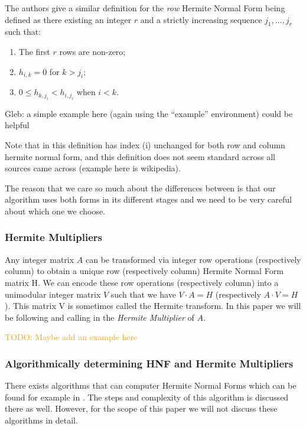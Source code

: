 \documentclass[oneside, a4paper, onecolumn, 11pt]{article}
\newcommand{\todo}[1]{
    \begin{mdframed}
        \textcolor{orange}{
        TODO: #1
        }
    \end{mdframed}
}
\begin{document}
The authors give a similar definition for the \textit{row} Hermite Normal Form being defined as there existing an integer \(r\) and a strictly increasing sequence \(j_1, \dots, j_r\) such that:
\begin{enumerate}[label=(\roman*)]
    \item The first \(r\) rows are non-zero; %
    \item \(h_{i, k} = 0\) for \(k > j_i\);
    \item \(0 \le h_{k, j_i} < h_{i, j_i}\) when \(i < k\).
\end{enumerate}

{\color{purple}Gleb: a simple example here (again using the ``example'' environment) could be helpful}

Note that in this definition has index (i) unchanged for both row and column hermite normal form, and this definition does not seem standard across all sources came across (example here is wikipedia).

The reason that we care so much about the differences between is that our algorithm uses both forms in its different stages and we need to be very careful about which one we choose.

\subsubsection{Hermite Multipliers}

Any integer matrix \(A\) can be transformed via integer row operations (respectively column) to obtain a unique row (respectively column) Hermite Normal Form matrix H. We can encode these row operations (respectively column) into a unimodular integer matrix \(V\) such that we have \(V \cdot A = H\) (respectively \(A \cdot V = H\)). This matrix V is sometimes called the Hermite transform. In this paper we will be following \cite{Hubert2013} and calling in the \textit{Hermite Multiplier} of \(A\).

\todo{Maybe add an example here}

\subsubsection{Algorithmically determining HNF and Hermite Multipliers}

There exists algorithms that can computer Hermite Normal Forms which can be found for example in \cite{cohen2013course}. The steps and complexity of this algorithm is discussed there as well. However, for the scope of this paper we will not discuss these algorithms in detail.
\end{document}
